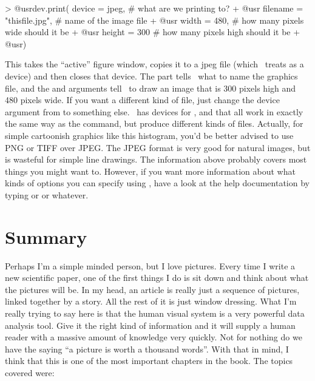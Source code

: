 \begin{rblock1}
> @usr{dev.print( device = jpeg, }             # what are we printing to?
+ @usr{           filename = "thisfile.jpg",}  # name of the image file
+ @usr{           width = 480, }               # how many pixels wide should it be
+ @usr{           height = 300}                # how many pixels high should it be
+ @usr{)}
\end{rblock1}
This takes the ``active'' figure window, copies it to a jpeg file (which \R\ treats as a device) and then closes that device. The  part tells \R\ what to name the graphics file, and the  and  arguments tell \R\ to draw an image that is 300 pixels high and 480 pixels wide. If you want a different kind of file, just change the device argument from  to something else. \R\ has devices for ,  and  that all work in exactly the same way as the  command, but produce different kinds of files. Actually, for simple cartoonish graphics like this histogram, you'd be better advised to use PNG or TIFF over JPEG. The JPEG format is very good for natural images, but is wasteful for simple line drawings. The information above probably covers most things you might want to. However, if you want more information about what kinds of options you can specify using \R, have a look at the help documentation by typing  or  or whatever.


\section{Summary}

Perhaps I'm a simple minded person, but I love pictures. Every time I write a new scientific paper, one of the first things I do is sit down and think about what the pictures will be. In my head, an article is really just a sequence of pictures, linked together by a story. All the rest of it is just window dressing. What I'm really trying to say here is that the human visual system is a very powerful data analysis tool. Give it the right kind of information and it will supply a human reader with a massive amount of knowledge very quickly. Not for nothing do we have the saying ``a picture is worth a thousand words''. With that in mind, I think that this is one of the most important chapters in the book. The topics covered were:

